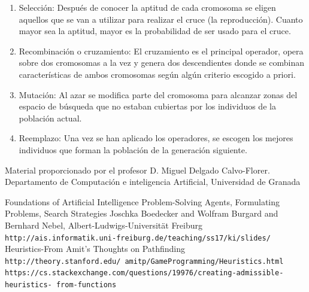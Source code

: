 \documentclass[12pt]{article}
\begin{document}
\begin{enumerate}
\item Selección: Después de conocer la aptitud de cada cromosoma se
  eligen aquellos que se van a utilizar para realizar el cruce (la
  reproducción). Cuanto mayor sea la aptitud, mayor es la probabilidad
  de ser usado para el cruce.

\item Recombinación o cruzamiento: El cruzamiento es el principal
  operador, opera sobre dos cromosomas a la vez y genera dos
  descendientes donde se combinan características de ambos cromosomas
  según algún criterio escogido a priori.

\item Mutación: Al azar se modifica parte del cromosoma para alcanzar
  zonas del espacio de búsqueda que no estaban cubiertas por los
  individuos de la población actual.

\item Reemplazo: Una vez se han aplicado los operadores, se escogen
  los mejores individuos que forman la población de la generación
  siguiente.
\end{enumerate}

\begin{thebibliography}{9}
Material proporcionado por el profesor
D. Miguel Delgado Calvo-Florer. Departamento de Computación e inteligencia Artificial, Universidad de Granada
 
Foundations of Artificial Intelligence
Problem-Solving Agents, Formulating Problems, Search Strategies
Joschka Boedecker and Wolfram Burgard and Bernhard Nebel, Albert-Ludwigs-Universität Freiburg
\texttt{http://ais.informatik.uni-freiburg.de/teaching/ss17/ki/slides/}
  Heuristics-From Amit’s Thoughts on Pathfinding\\
  \texttt{http://theory.stanford.edu/~amitp/GameProgramming/Heuristics.html}
  \texttt{https://cs.stackexchange.com/questions/19976/creating-admissible-heuristics-
    from-functions}
\end{thebibliography}
\end{document}
